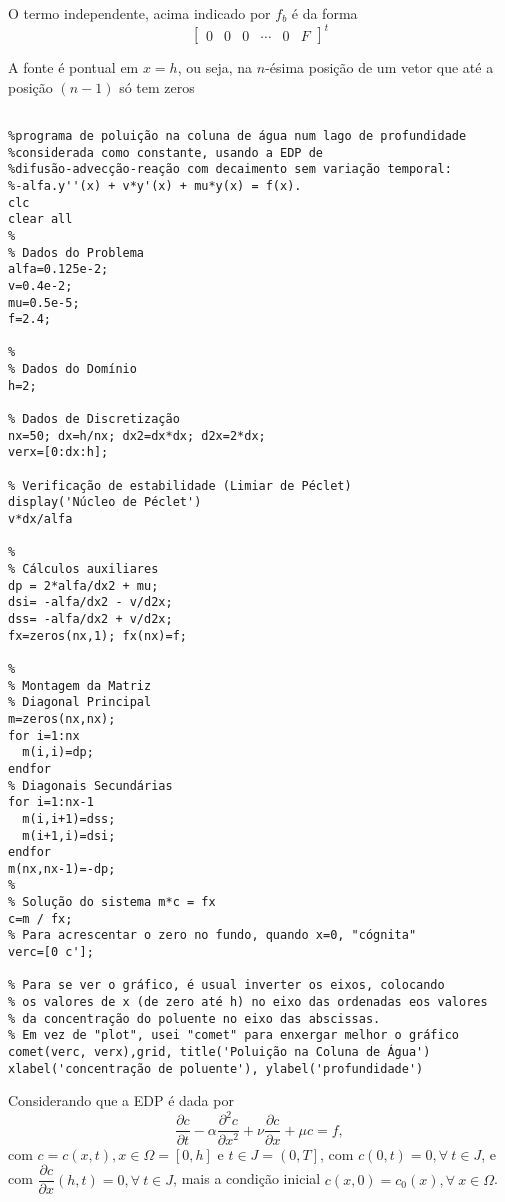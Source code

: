 O termo independente, acima indicado por \(f_b\) é da forma
\[\left[\begin{array}{cccccc}
0 & 0 & 0 & \cdots & 0 & F
\end{array}\right]^t\]

\begin{remark}
A fonte é pontual em \(x=h\), ou seja, na \(n\)-ésima posição de um vetor que até a posição \((n-1)\) só tem zeros
\end{remark}


\begin{verbatim}
    
%programa de poluição na coluna de água num lago de profundidade
%considerada como constante, usando a EDP de
%difusão-advecção-reação com decaimento sem variação temporal:
%-alfa.y''(x) + v*y'(x) + mu*y(x) = f(x).
clc
clear all
%
% Dados do Problema
alfa=0.125e-2;
v=0.4e-2;
mu=0.5e-5;
f=2.4;

%
% Dados do Domínio
h=2;

% Dados de Discretização
nx=50; dx=h/nx; dx2=dx*dx; d2x=2*dx;
verx=[0:dx:h];

% Verificação de estabilidade (Limiar de Péclet)
display('Núcleo de Péclet')
v*dx/alfa

% 
% Cálculos auxiliares
dp = 2*alfa/dx2 + mu; 
dsi= -alfa/dx2 - v/d2x;
dss= -alfa/dx2 + v/d2x;
fx=zeros(nx,1); fx(nx)=f;

%
% Montagem da Matriz
% Diagonal Principal
m=zeros(nx,nx);
for i=1:nx
  m(i,i)=dp;
endfor
% Diagonais Secundárias
for i=1:nx-1
  m(i,i+1)=dss;
  m(i+1,i)=dsi;
endfor
m(nx,nx-1)=-dp;
%
% Solução do sistema m*c = fx
c=m / fx;
% Para acrescentar o zero no fundo, quando x=0, "cógnita"
verc=[0 c'];

% Para se ver o gráfico, é usual inverter os eixos, colocando
% os valores de x (de zero até h) no eixo das ordenadas eos valores
% da concentração do poluente no eixo das abscissas.
% Em vez de "plot", usei "comet" para enxergar melhor o gráfico
comet(verc, verx),grid, title('Poluição na Coluna de Água')
xlabel('concentração de poluente'), ylabel('profundidade')
\end{verbatim}




Considerando que a EDP é dada por
\begin{equation}
\label{eq:concentracaoxt}
\dfrac{\partial c}{\partial t} - \alpha \dfrac{\partial^{2} c}{\partial x^{2}}  + \nu \dfrac{\partial c}{\partial x} + \mu c = f,
\end{equation}
com $c = c (x, t), x \in \Omega = [0 , h]$ e $t \in J = \left(0, T\right]$, com $c\left(0, t\right) = 0, \forall~ t \in J$, e com $\dfrac{\partial c}{\partial x}(h,t) = 0, \forall~t \in J$, mais a condição inicial $c\left(x, 0\right) = c_{0}\left(x\right), \forall~ x \in \Omega$. 

